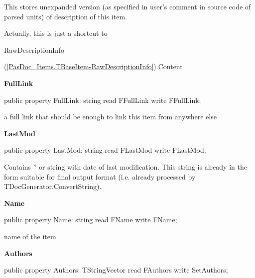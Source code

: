 \documentclass{report}
\newif\ifpdf
\begin{document}
\begin{list}{}
\begin{flushleft}
\ifpdf
\end{flushleft}
\fi


\par This stores unexpanded version (as specified in user's comment in source code of parsed units) of description of this item.

Actually, this is just a shortcut to \begin{ttfamily}\begin{ttfamily}RawDescriptionInfo\end{ttfamily}(\ref{PasDoc_Items.TBaseItem-RawDescriptionInfo}).Content\end{ttfamily}\label{PasDoc_Items.TBaseItem-FullLink}
\item[\textbf{FullLink}\hfill]
\ifpdf
\begin{flushleft}
\fi
\begin{ttfamily}
public property FullLink: string read FFullLink write FFullLink;\end{ttfamily}

\ifpdf
\end{flushleft}
\fi


\par a full link that should be enough to link this item from anywhere else\label{PasDoc_Items.TBaseItem-LastMod}
\item[\textbf{LastMod}\hfill]
\ifpdf
\begin{flushleft}
\fi
\begin{ttfamily}
public property LastMod: string read FLastMod write FLastMod;\end{ttfamily}

\ifpdf
\end{flushleft}
\fi


\par Contains '' or string with date of last modification. This string is already in the form suitable for final output format (i.e. already processed by TDocGenerator.ConvertString).\label{PasDoc_Items.TBaseItem-Name}
\item[\textbf{Name}\hfill]
\ifpdf
\begin{flushleft}
\fi
\begin{ttfamily}
public property Name: string read FName write FName;\end{ttfamily}

\ifpdf
\end{flushleft}
\fi


\par name of the item\label{PasDoc_Items.TBaseItem-Authors}
\item[\textbf{Authors}\hfill]
\ifpdf
\begin{flushleft}
\fi
\begin{ttfamily}
public property Authors: TStringVector read FAuthors write SetAuthors;\end{ttfamily}


\end{flushleft}
\end{list}
\end{document}
